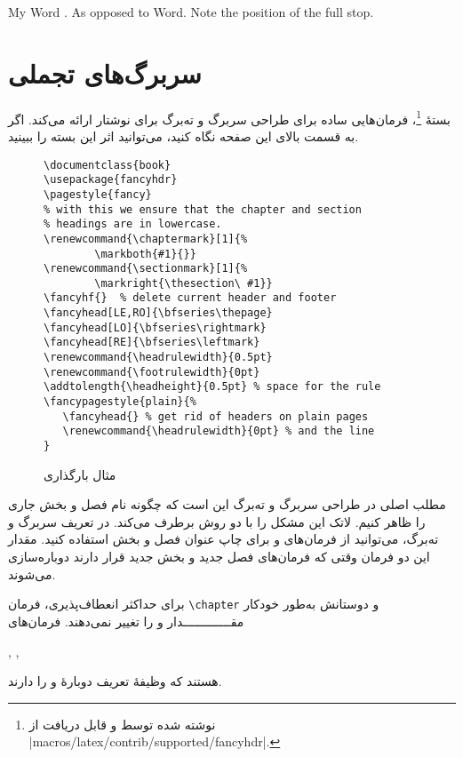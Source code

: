 \begin{example}
My Word . As opposed
to Word. Note the
position of the full stop.
\end{example}

\section{سربرگ‌های تجملی}\label{sec:fancy}

بستهٔ 
 \footnote{نوشته شده توسط  و قابل دریافت از 
  \CTANref|macros/latex/contrib/supported/fancyhdr|.}،
 فرمان‌هایی ساده برای طراحی سربرگ و ته‌برگ برای نوشتار‌ ارائه می‌کند. اگر به قسمت بالای این صفحه نگاه کنید، می‌توانید اثر این بسته را ببینید.


\begin{figure}[!htbp]
\setLR
\begin{lined}{\textwidth}
\begin{verbatim}
\documentclass{book}
\usepackage{fancyhdr}
\pagestyle{fancy}
% with this we ensure that the chapter and section
% headings are in lowercase.
\renewcommand{\chaptermark}[1]{%
        \markboth{#1}{}}
\renewcommand{\sectionmark}[1]{%
        \markright{\thesection\ #1}}
\fancyhf{}  % delete current header and footer
\fancyhead[LE,RO]{\bfseries\thepage}
\fancyhead[LO]{\bfseries\rightmark}
\fancyhead[RE]{\bfseries\leftmark}
\renewcommand{\headrulewidth}{0.5pt}
\renewcommand{\footrulewidth}{0pt}
\addtolength{\headheight}{0.5pt} % space for the rule
\fancypagestyle{plain}{%
   \fancyhead{} % get rid of headers on plain pages
   \renewcommand{\headrulewidth}{0pt} % and the line
}
\end{verbatim}
\end{lined}
\setRL
\caption{مثال بارگذاری } \label{fancyhdr}
\end{figure}


مطلب اصلی در طراحی سربرگ و ته‌برگ این است که چگونه نام فصل و بخش جاری را ظاهر کنیم. لاتک این مشکل را با دو روش برطرف می‌کند. در تعریف سربرگ و ته‌برگ، می‌توانید از فرمان‌های   و  برای چاپ عنوان فصل و بخش استفاده کنید. مقدار این دو فرمان وقتی که فرمان‌های فصل جدید و بخش جدید قرار دارند دوباره‌سازی می‌شوند.

برای حداکثر انعطاف‌پذیری، فرمان \verb|\chapter| و دوستانش به‌طور خودکار مقـــــــــــــدار  و  را تغییر نمی‌دهند. فرمان‌های  
\begin{latin}
, ,  
\end{latin}
 هستند که وظیفهٔ تعریف دوبارهٔ 
و  را دارند.

